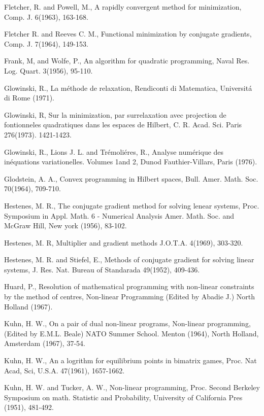 \begin{thebibliography}{99}
 {Fletcher, R. and Powell, M}., A rapidly convergent
  method for minimization, Comp. J. 6(1963), 163-168.

 {Fletcher R. and Reeves C. M}., Functional
  minimization by conjugate gradients, Comp. J. 7(1964), 149-153.

 {Frank, M, and Wolfe, P}., An algorithm for quadratic
  programming, Naval Res. Log. Quart. 3(1956), 95-110.  

 {Glowinski, R}., La m\'{e}thode de relaxation,
  Rendiconti di Matematica, Universit\'{a} di Rome (1971).  

 {Glowinski, R}, Sur la minimization, par surrelaxation
  avec projection de fontionneles quadratiques dans les espaces de
  Hilbert, C. R. Acad. Sci. Paris 276(1973). 1421-1423.  

 {Glowinski, R., Lions J. L. and Tr\'{e}moli\'{e}res,
  R}., Analyse num\'{e}rique des in\'{e}quations
  variationelles. Volumes 1and 2, Dunod Fauthier-Villars, Paris
  (1976).
  
 {Glodstein, A. A}., Convex programming in Hilbert
  spaces, Bull. Amer. Math. Soc. 70(1964), 709-710.  

 {Hestenes, M. R}., The conjugate gradient method for
  solving lenear systems, Proc. Symposium in Appl. Math. 6 - Numerical
  Analysis Amer. Math. Soc. and McGraw Hill, New york (1956),
  83-102.  

 {Hestenes, M. R}, Multiplier and gradient methods
  J.O.T.A. 4(1969), 303-320.  

 {Hestenes, M. R. and Stiefel, E}., Methods of
  conjugate gradient for solving linear systems, J. Res. Nat. Bureau
  of Standarada 49(1952), 409-436. 

 {Huard, P}., Resolution of mathematical programming
  with non-linear constraints by the method of centres, Non-linear
  Programming (Edited by Abadie J.) North Holland (1967).   

 {Kuhn, H. W}., On a pair of dual non-linear programs,
  Non-linear programming, (Edited by E.M.L. Beale) NATO Summer
  School. Menton (1964), North Holland, Amsterdam (1967), 37-54.   

 {Kuhn, H. W}., An a logrithm for equilibrium points in
  bimatrix games, Proc. Nat Acad, Sci, U.S.A. 47(1961), 1657-1662.  

 {Kuhn, H. W. and Tucker, A. W}.,\pageoriginale
  Non-linear programming, Proc. Second Berkeley Symposium on
  math. Statistic and Probability, University of California Pres
  (1951), 481-492.  


\end{thebibliography}
